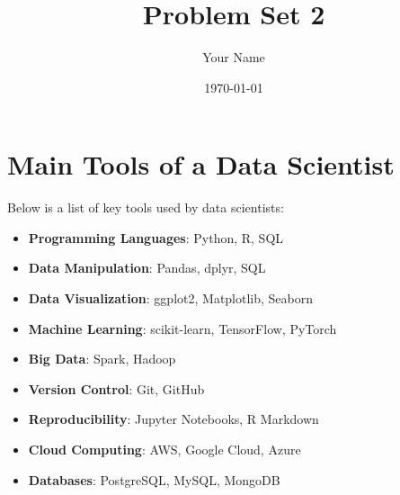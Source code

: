 \documentclass{article}
\title{Problem Set 2}
\author{Your Name}
\date{\today}
\begin{document}
\maketitle

\section*{Main Tools of a Data Scientist}

Below is a list of key tools used by data scientists:

\begin{itemize}
    \item \textbf{Programming Languages}: Python, R, SQL
    \item \textbf{Data Manipulation}: Pandas, dplyr, SQL
    \item \textbf{Data Visualization}: ggplot2, Matplotlib, Seaborn
    \item \textbf{Machine Learning}: scikit-learn, TensorFlow, PyTorch
    \item \textbf{Big Data}: Spark, Hadoop
    \item \textbf{Version Control}: Git, GitHub
    \item \textbf{Reproducibility}: Jupyter Notebooks, R Markdown
    \item \textbf{Cloud Computing}: AWS, Google Cloud, Azure
    \item \textbf{Databases}: PostgreSQL, MySQL, MongoDB
\end{itemize}
\end{document}
